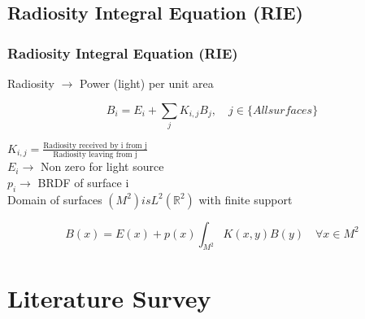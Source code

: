   \subsection{Radiosity Integral Equation (RIE)}


      \begin{frame}\frametitle{Radiosity Integral Equation (RIE)}

      Radiosity $\rightarrow $ Power (light) per unit area
      
      \begin{equation}
      B_i=E_i+\sum_j K_{i,j} B_j, \quad j \in \{All surfaces\}
      \end{equation}
      
      \centering
      $K_{i,j}=\frac{\text {Radiosity received by i from j}}{\text{Radiosity leaving from j}}$\\
      
      \vspace{2 mm}
      \centering
      $E_i \rightarrow $  Non zero for light source\\
      
      \vspace{2 mm}
      \centering
      $p_i \rightarrow $  BRDF of surface i\\

      \vspace{2 mm}
      \centering
      Domain of surfaces $(M^2) is L^2(\mathbb{R}^2)$ with finite support

      \begin{equation}
      B(x)=E(x)+p(x)\int_{M^2} K(x,y)B(y)\quad  \forall x \in M^2
      \end{equation}
      \end{frame}


\section{Literature Survey}

